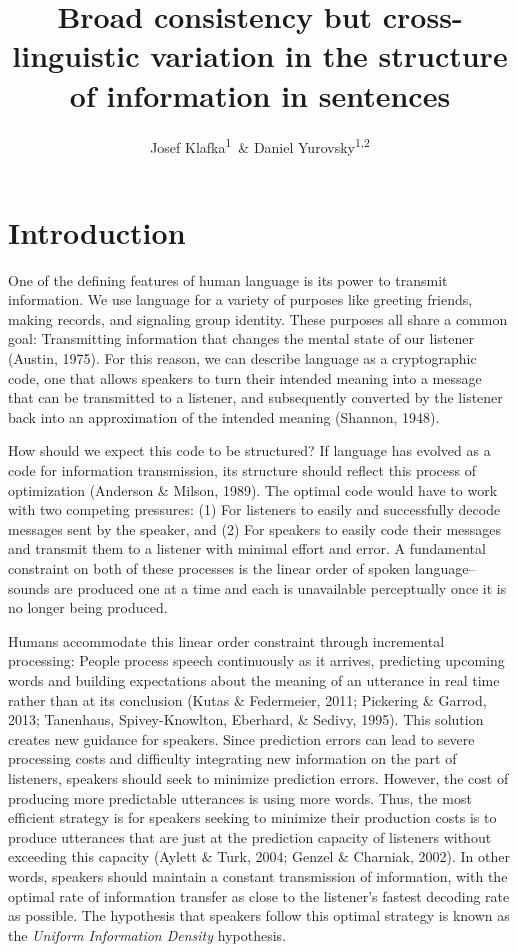 \documentclass[man,floatsintext]{apa6}
\title{Broad consistency but cross-linguistic variation in the structure of information in sentences}
\author{Josef Klafka\textsuperscript{1}~\& Daniel Yurovsky\textsuperscript{1,2}}
\date{}
\affiliation{
\vspace{0.5cm}
\textsuperscript{1} Carnegie Mellon University\\\textsuperscript{2} University of Chicago}
\begin{document}
\maketitle

\hypertarget{introduction}{%
\section{Introduction}\label{introduction}}

One of the defining features of human language is its power to transmit information. We use language for a variety of purposes like greeting friends, making records, and signaling group identity. These purposes all share a common goal: Transmitting information that changes the mental state of our listener (Austin, 1975). For this reason, we can describe language as a cryptographic code, one that allows speakers to turn their intended meaning into a message that can be transmitted to a listener, and subsequently converted by the listener back into an approximation of the intended meaning (Shannon, 1948).

How should we expect this code to be structured? If language has evolved as a code for information transmission, its structure should reflect this process of optimization (Anderson \& Milson, 1989). The optimal code would have to work with two competing pressures: (1) For listeners to easily and successfully decode messages sent by the speaker, and (2) For speakers to easily code their messages and transmit them to a listener with minimal effort and error. A fundamental constraint on both of these processes is the linear order of spoken language--sounds are produced one at a time and each is unavailable perceptually once it is no longer being produced.

Humans accommodate this linear order constraint through incremental processing: People process speech continuously as it arrives, predicting upcoming words and building expectations about the meaning of an utterance in real time rather than at its conclusion (Kutas \& Federmeier, 2011; Pickering \& Garrod, 2013; Tanenhaus, Spivey-Knowlton, Eberhard, \& Sedivy, 1995). This solution creates new guidance for speakers. Since prediction errors can lead to severe processing costs and difficulty integrating new information on the part of listeners, speakers should seek to minimize prediction errors. However, the cost of producing more predictable utterances is using more words. Thus, the most efficient strategy is for speakers seeking to minimize their production costs is to produce utterances that are just at the prediction capacity of listeners without exceeding this capacity (Aylett \& Turk, 2004; Genzel \& Charniak, 2002). In other words, speakers should maintain a constant transmission of information, with the optimal rate of information transfer as close to the listener's fastest decoding rate as possible. The hypothesis that speakers follow this optimal strategy is known as the \emph{Uniform Information Density} hypothesis.
\end{document}
